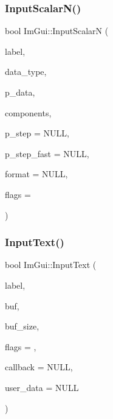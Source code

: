 \subsubsection{\texorpdfstring{Input\+Scalar\+N()}{InputScalarN()}}
{\footnotesize\ttfamily bool Im\+Gui\+::\+Input\+ScalarN (\begin{DoxyParamCaption}\item[{const char $\ast$}]{label,  }\item[{Im\+Gui\+Data\+Type}]{data\+\_\+type,  }\item[{\hyperlink{imgui__impl__opengl3__loader_8h_ac668e7cffd9e2e9cfee428b9b2f34fa7}{void} $\ast$}]{p\+\_\+data,  }\item[{int}]{components,  }\item[{const \hyperlink{imgui__impl__opengl3__loader_8h_ac668e7cffd9e2e9cfee428b9b2f34fa7}{void} $\ast$}]{p\+\_\+step = {\ttfamily NULL},  }\item[{const \hyperlink{imgui__impl__opengl3__loader_8h_ac668e7cffd9e2e9cfee428b9b2f34fa7}{void} $\ast$}]{p\+\_\+step\+\_\+fast = {\ttfamily NULL},  }\item[{const char $\ast$}]{format = {\ttfamily NULL},  }\item[{Im\+Gui\+Input\+Text\+Flags}]{flags = {} }\end{DoxyParamCaption})}

\mbox{\label{namespaceImGui_aa72b5760a3a206729723a587ac7c8519}} 
\subsubsection{\texorpdfstring{Input\+Text()}{InputText()}}
{\footnotesize\ttfamily bool Im\+Gui\+::\+Input\+Text (\begin{DoxyParamCaption}\item[{const char $\ast$}]{label,  }\item[{char $\ast$}]{buf,  }\item[{size\+\_\+t}]{buf\+\_\+size,  }\item[{Im\+Gui\+Input\+Text\+Flags}]{flags = {},  }\item[{\hyperlink{imgui_8h_a484ebc32fe6c1e2d44ff601a0ca6b179}{Im\+Gui\+Input\+Text\+Callback}}]{callback = {\ttfamily NULL},  }\item[{\hyperlink{imgui__impl__opengl3__loader_8h_ac668e7cffd9e2e9cfee428b9b2f34fa7}{void} $\ast$}]{user\+\_\+data = {\ttfamily NULL} }\end{DoxyParamCaption})}

